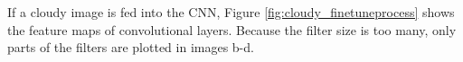 If a cloudy image is fed into the CNN, Figure \ref{fig:cloudy_finetuneprocess} shows the feature maps of convolutional layers. Because the filter size is too many, only parts of the filters are plotted in images b-d.

\graphicspath{ {./Figures/DifferentLayers/} }

\begin{figure}[htb]
    \centering
\end{figure}
